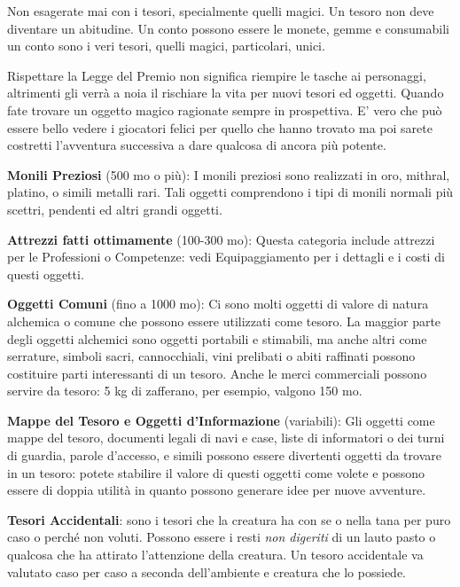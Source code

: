 \begin{multicols}{2}
\begin{narratore}
Non esagerate mai con i tesori, specialmente quelli magici. Un tesoro non deve diventare un abitudine. Un conto possono essere le monete, gemme e consumabili un conto sono i veri tesori, quelli magici, particolari, unici.

Rispettare la Legge del Premio non significa riempire le tasche ai personaggi, altrimenti gli verrà a noia il rischiare la vita per nuovi tesori ed oggetti. Quando fate trovare un oggetto magico ragionate sempre in prospettiva. E' vero che può essere bello vedere i giocatori felici per quello che hanno trovato ma poi sarete costretti l'avventura successiva a dare qualcosa di ancora più potente.
\end{narratore}

\textbf{Monili Preziosi} (500 mo o più): I monili preziosi sono realizzati in oro, mithral, platino, o simili metalli rari. Tali oggetti comprendono i tipi di monili normali più scettri, pendenti ed altri grandi oggetti.

\textbf{Attrezzi fatti ottimamente} (100-300 mo): Questa categoria include attrezzi per le Professioni o Competenze: vedi Equipaggiamento per i dettagli e i costi di questi oggetti.

\textbf{Oggetti Comuni} (fino a 1000 mo): Ci sono molti oggetti di valore di natura alchemica o comune che possono essere utilizzati come tesoro. La maggior parte degli oggetti alchemici sono oggetti portabili e stimabili, ma anche altri come serrature, simboli sacri, cannocchiali, vini prelibati o abiti raffinati possono costituire parti interessanti di un tesoro. Anche le merci commerciali possono servire da tesoro: 5 kg di zafferano, per esempio, valgono 150 mo.

\textbf{Mappe del Tesoro e Oggetti d'Informazione} (variabili): Gli oggetti come mappe del tesoro, documenti legali di navi e case, liste di informatori o dei turni di guardia, parole d'accesso, e simili possono essere divertenti oggetti da trovare in un tesoro: potete stabilire il valore di questi oggetti come volete e possono essere di doppia utilità in quanto possono generare idee per nuove avventure.

\textbf{Tesori Accidentali}: sono i tesori che la creatura ha con se o nella tana per puro caso o perché non voluti. Possono essere i resti \emph{non digeriti} di un lauto pasto o qualcosa che ha attirato l'attenzione della creatura. Un tesoro accidentale  va valutato caso per caso a seconda dell'ambiente e creatura che lo possiede.


\end{multicols}

